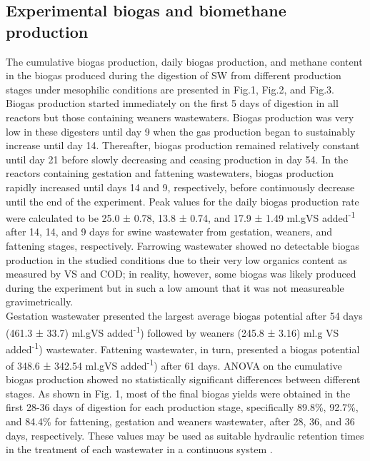 \subsection{Experimental biogas and biomethane production}
The cumulative biogas production, daily biogas production, and methane content in the biogas produced during the digestion of SW from different production stages under mesophilic conditions are presented in Fig.1, Fig.2, and Fig.3.\\

Biogas production started immediately on the first 5 days of digestion in all reactors but those containing weaners wastewaters. Biogas production was very low in these digesters until day 9 when the gas production began to sustainably increase until day 14. Thereafter, biogas production remained relatively constant until day 21 before slowly decreasing and ceasing production in day 54. In the reactors containing gestation and fattening wastewaters, biogas production rapidly increased until days 14 and 9, respectively, before continuously decrease until the end of the experiment. Peak values for the daily biogas production rate were calculated to be 25.0 ± 0.78, 13.8 ± 0.74, and 17.9 ± 1.49 ml.gVS added\textsuperscript{-1} after 14, 14, and 9 days for swine wastewater from gestation, weaners, and fattening stages, respectively.
Farrowing wastewater showed no detectable biogas production in the studied conditions due to their very low organics content as measured by VS and COD; in reality, however, some biogas was likely produced during the experiment but in such a low amount that it was not measureable gravimetrically.\\
Gestation wastewater presented the largest average biogas potential after 54 days (461.3 ± 33.7) ml.gVS added\textsuperscript{-1}) followed by weaners (245.8 ± 3.16) ml.g VS added\textsuperscript{-1}) wastewater. Fattening wastewater, in turn, presented a biogas potential of 348.6 ± 342.54 ml.gVS added\textsuperscript{-1}) after 61 days.  ANOVA on the cumulative biogas production showed no statistically significant differences between different stages. As shown in Fig. 1, most of the final biogas yields were obtained in the first 28-36 days of digestion for each production stage, specifically 89.8\%, 92.7\%, and 84.4\% for fattening, gestation and weaners wastewater, after 28, 36, and 36 days, respectively. These values may be used as suitable hydraulic retention times in the treatment of each wastewater in a continuous system \cite{Li_2013}.

